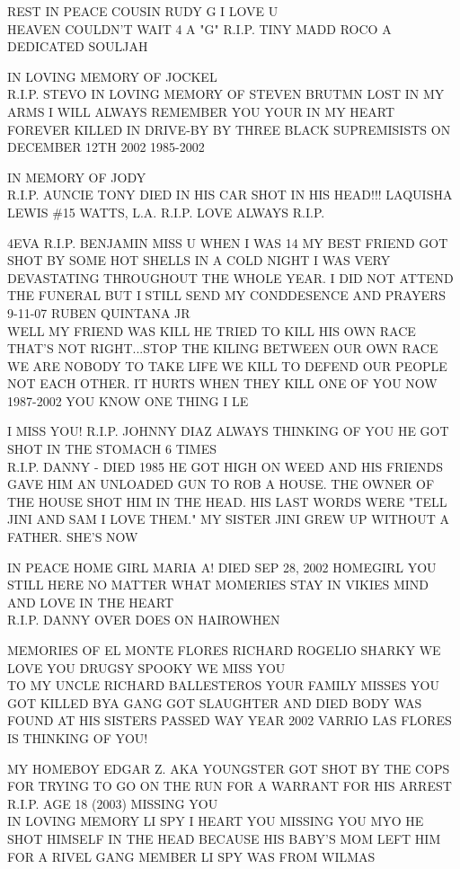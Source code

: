 \documentclass[10pt,letterpaper]{article}
\begin{document}
REST IN PEACE COUSIN RUDY G I LOVE U\\
HEAVEN COULDN'T WAIT 4 A "G" R.I.P. TINY MADD ROCO A DEDICATED SOULJAH

IN LOVING MEMORY OF JOCKEL\\
R.I.P. STEVO IN LOVING MEMORY OF STEVEN BRUTMN LOST IN MY ARMS I WILL ALWAYS REMEMBER YOU YOUR IN MY HEART FOREVER KILLED IN DRIVE{-}BY BY THREE BLACK SUPREMISISTS ON DECEMBER 12TH 2002 1985{-}2002

IN MEMORY OF JODY\\
R.I.P. AUNCIE TONY DIED IN HIS CAR SHOT IN HIS HEAD!!! LAQUISHA LEWIS \#15 WATTS, L.A. R.I.P. LOVE ALWAYS R.I.P.

4EVA R.I.P. BENJAMIN MISS U WHEN I WAS 14 MY BEST FRIEND GOT SHOT BY SOME HOT SHELLS IN A COLD NIGHT I WAS VERY DEVASTATING THROUGHOUT THE WHOLE YEAR.  I DID NOT ATTEND THE FUNERAL BUT I STILL SEND MY CONDDESENCE AND PRAYERS 9{-}11{-}07 RUBEN QUINTANA JR\\
WELL MY FRIEND WAS KILL HE TRIED TO KILL HIS OWN RACE THAT'S NOT RIGHT...STOP THE KILING BETWEEN OUR OWN RACE WE ARE NOBODY TO TAKE LIFE WE KILL TO DEFEND OUR PEOPLE NOT EACH OTHER.  IT HURTS WHEN THEY KILL ONE OF YOU NOW 1987{-}2002 YOU KNOW ONE THING I LE

I MISS YOU!  R.I.P. JOHNNY DIAZ ALWAYS THINKING OF YOU HE GOT SHOT IN THE STOMACH 6 TIMES\\
R.I.P. DANNY {-} DIED 1985 HE GOT HIGH ON WEED AND HIS FRIENDS GAVE HIM AN UNLOADED GUN TO ROB A HOUSE.  THE OWNER OF THE HOUSE SHOT HIM IN THE HEAD.  HIS LAST WORDS WERE "TELL JINI AND SAM I LOVE THEM."  MY SISTER JINI GREW UP WITHOUT A FATHER.  SHE'S NOW

IN PEACE HOME GIRL MARIA A!  DIED SEP 28, 2002 HOMEGIRL YOU STILL HERE NO MATTER WHAT MOMERIES STAY IN VIKIES MIND AND LOVE IN THE HEART\\
R.I.P. DANNY OVER DOES ON HAIROWHEN

MEMORIES OF EL MONTE FLORES RICHARD ROGELIO SHARKY WE LOVE YOU DRUGSY SPOOKY WE MISS YOU\\
TO MY UNCLE RICHARD BALLESTEROS YOUR FAMILY MISSES YOU GOT KILLED BYA GANG GOT SLAUGHTER AND DIED BODY WAS FOUND AT HIS SISTERS PASSED WAY YEAR 2002 VARRIO LAS FLORES IS THINKING OF YOU!

MY HOMEBOY EDGAR Z. AKA YOUNGSTER GOT SHOT BY THE COPS FOR TRYING TO GO ON THE RUN FOR A WARRANT FOR HIS ARREST R.I.P. AGE 18 (2003) MISSING YOU\\
IN LOVING MEMORY LI SPY I HEART YOU MISSING YOU MYO HE SHOT HIMSELF IN THE HEAD BECAUSE HIS BABY'S MOM LEFT HIM FOR A RIVEL GANG MEMBER LI SPY WAS FROM WILMAS
\end{document}
